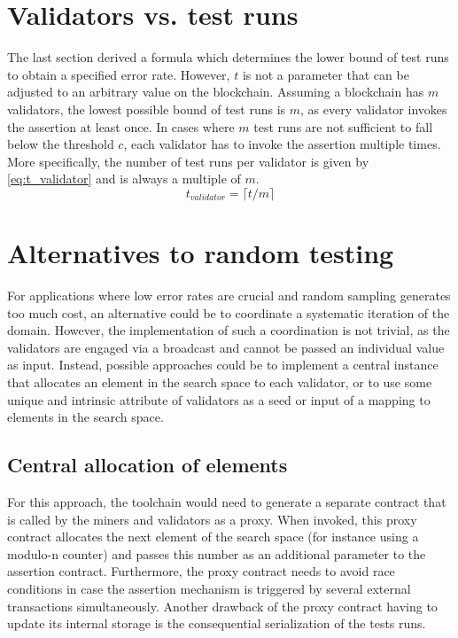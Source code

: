 \section{Validators vs. test runs}
The last section derived a formula which determines the lower bound of test runs to obtain a specified error rate. However, $t$ is not a parameter that can be adjusted to an arbitrary value on the blockchain. Assuming a blockchain has $m$ validators, the lowest possible bound of test runs is $m$, as every validator invokes the assertion at least once. In cases where $m$ test runs are not sufficient to fall below the threshold $c$, each validator has to invoke the assertion multiple times. More specifically, the number of test runs per validator is given by \eqref{eq:t_validator} and is always a multiple of $m$.
\begin{equation}\label{eq:t_validator}
t_{validator} = \lceil t / m \rceil
\end{equation}

\section{Alternatives to random testing}\label{sec:alt_random}
For applications where low error rates are crucial and random sampling generates too much cost, an alternative could be to coordinate a systematic iteration of the domain. However, the implementation of such a coordination is not trivial, as the validators are engaged via a broadcast and cannot be passed an individual value as input. Instead, possible approaches could be to implement a central instance that allocates an element in the search space to each validator, or to use some unique and intrinsic attribute of validators as a seed or input of a mapping to elements in the search space.

\subsection{Central allocation of elements}
For this approach, the toolchain would need to generate a separate contract that is called by the miners and validators as a proxy. When invoked, this proxy contract allocates the next element of the search space (for instance using a modulo-n counter) and passes this number as an additional parameter to the assertion contract. Furthermore, the proxy contract needs to avoid race conditions in case the assertion mechanism is triggered by several external transactions simultaneously. Another drawback of the proxy contract having to update its internal storage is the consequential serialization of the tests runs.


